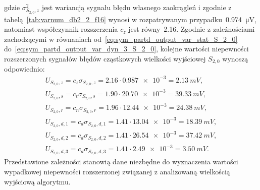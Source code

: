 gdzie $\sigma_{S_{2,0},z}^{2}$ jest wariancją sygnału błędu własnego zaokrągleń i zgodnie z tabelą~\ref{tab:varnum_db2_2_f16} wynosi w rozpatrywanym przypadku~\qty{0.974}{\micro V}, natomiast współczynnik rozszerzenia $c_{z}$ jest równy~\num{2.16}. Zgodnie z zależnościami zachodzącymi w równaniach od~\eqref{eq:sym_partd_output_var_stat_S_2_0} do~\eqref{eq:sym_partd_output_var_dyn_3_S_2_0}, kolejne wartości niepewności rozszerzonych sygnałów błędów cząstkowych wielkości wyjściowej $S_{2,0}$ wynoszą odpowiednio:
\begin{gather}
U_{S_{2,0},z} = c_{z} \sigma_{S_{2,0},z} = \num{2.16} \cdot \num{0.987e-3} = \qty{2.13}{mV} \label{eq:sym_partd_output_unc_roun_S_2_0},\\
U_{S_{2,0},s} = c_{t} \sigma_{S_{2,0},s} = \num{1.90} \cdot \num{20.70e-3} = \qty{39.33}{mV} \label{eq:sym_partd_output_unc_stat_S_2_0}, \\
U_{S_{2,0},r} = c_{n} \sigma_{S_{2,0},r} = \num{1.96} \cdot \num{12.44e-3} = \qty{24.38}{mV} \label{eq:sym_partd_output_unc_rand_S_2_0}, \\
U_{S_{2,0},d,1} = c_{d} \sigma_{S_{2,0},d,1} = \num{1.41} \cdot \num{13.04e-3} = \qty{18.39}{mV} \label{eq:sym_partd_output_unc_dyn_1_S_2_0}, \\
U_{S_{2,0},d,2} = c_{d} \sigma_{S_{2,0},d,2} = \num{1.41} \cdot \num{26.54e-3} = \qty{37.42}{mV} \label{eq:sym_partd_output_unc_dyn_2_S_2_0}, \\
U_{S_{2,0},d,3} = c_{d} \sigma_{S_{2,0},d,3} = \num{1.41} \cdot \num{2.49e-3} = \qty{3.50}{mV} \label{eq:sym_partd_output_unc_dyn_3_S_2_0}.
\end{gather}
Przedstawione zależności stanowią dane niezbędne do wyznaczenia wartości wypadkowej niepewności rozszerzonej związanej z analizowaną wielkością wyjściową algorytmu.

